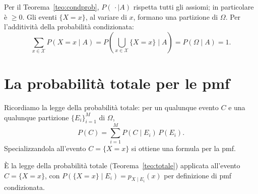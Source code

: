 
\begin{dimostrazione}
 Per il Teorema~\ref{teo:condprob}, $P(\,\cdot \mid A)$ rispetta
tutti gli assiomi; in particolare è $\geq 0$.
 Gli eventi $\{X = x\}$, al variare di $x$, formano una partizione di $\Omega$. Per l'additività
della probabilità condizionata:
\[ \sum_{x \in \mathcal{X}} P(X = x \mid A) = P\left( \bigcup_{x \in \mathcal{X}} \{X = x\} \;\Big|\; A \right) =
   P(\Omega \mid A) = 1 . \]
\end{dimostrazione}

\section{La probabilità totale per le pmf}

Ricordiamo la legge della probabilità totale: per un qualunque evento $C$ e una qualunque partizione
$\{E_i\}_{i=1}^{M}$ di $\Omega$,
\[ P(C) = \sum_{i=1}^{M} P(C \mid E_i)\, P(E_i) . \]
Specializzandola all'evento $C = \{X = x\}$ si ottiene una formula per la pmf.


\begin{dimostrazione}
\passo{} È la legge della probabilità totale (Teorema~\ref{teo:totale}) applicata all'evento $C = \{X = x\}$, con
$P(\{X = x\} \mid E_i) = p_{X \mid E_i}(x)$ per definizione di pmf condizionata.
\end{dimostrazione}

